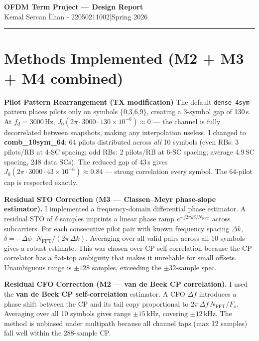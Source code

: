 \documentclass[10pt,a4paper]{article}
\begin{document}
\begin{center}
  {\large\textbf{OFDM Term Project --- Design Report}} \\[2pt]
  {\normalsize Kemal Sercan İlhan - 22050211002\quad|\quad Spring 2026}
\end{center}

\vspace{2pt}\hrule\vspace{4pt}

\section{Methods Implemented (M2 + M3 + M4 combined)}

\textbf{Pilot Pattern Rearrangement (TX modification) }
The default \texttt{dense\_4sym} pattern places pilots only on symbols \{0,3,6,9\},
creating a 3-symbol gap of 130\,\textmu s. At $f_d=3000$\,Hz,
$J_0(2\pi \cdot 3000 \cdot 130\times10^{-6}) \approx 0$ ---
the channel is fully decorrelated between snapshots, making any interpolation useless.
I changed to \textbf{comb\_10sym\_64}: 64 pilots distributed across \emph{all} 10 symbols
(even RBs: 3 pilots/RB at 4-SC spacing; odd RBs: 2 pilots/RB at 6-SC spacing;
average 4.9\,SC spacing, 248 data SCs).
The reduced gap of 43\,\textmu s gives $J_0(2\pi\cdot3000\cdot43\times10^{-6})\approx0.84$
--- strong correlation every symbol. The 64-pilot cap is respected exactly.

\textbf{Residual STO Correction (M3 --- Classen--Meyr phase-slope estimator).}
I implemented a frequency-domain differential phase estimator.
A residual STO of $\delta$ samples imprints a linear phase ramp
$e^{-j2\pi k\delta/N_\text{FFT}}$ across subcarriers.
For each consecutive pilot pair with known frequency spacing $\Delta k$,
$\delta = -\Delta\phi \cdot N_\text{FFT}/(2\pi\,\Delta k)$.
Averaging over all valid pairs across all 10 symbols gives a robust estimate.
This was chosen over CP self-correlation because the CP correlator has a
flat-top ambiguity that makes it unreliable for small offsets.
Unambiguous range is $\pm128$ samples, exceeding the $\pm32$-sample spec.

\textbf{Residual CFO Correction (M2 --- van de Beek CP correlation).}
I used the \textbf{van de Beek CP self-correlation} estimator.
A CFO $\Delta f$ introduces a phase shift between the CP and its tail copy
proportional to $2\pi\,\Delta f\,N_\text{FFT}/F_s$.
Averaging over all 10 symbols gives range $\pm15$\,kHz, covering $\pm12$\,kHz.
The method is unbiased under multipath because all channel taps (max 12 samples)
fall well within the 288-sample CP.
\end{document}
